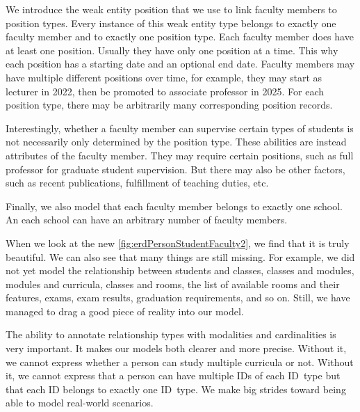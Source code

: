 We introduce the weak entity position that we use to link faculty members to position types.
Every instance of this weak entity type belongs to exactly one faculty member and to exactly one position type.
Each faculty member does have at least one position.
Usually they have only one position at a time.
This why each position has a starting date and an optional end date.
Faculty members may have multiple different positions over time, for example, they may start as lecturer in 2022, then be promoted to associate professor in 2025.
For each position type, there may be arbitrarily many corresponding position records.

Interestingly, whether a faculty member can supervise certain types of students is not necessarily only determined by the position type.
These abilities are instead attributes of the faculty member.
They may require certain positions, such as full professor for graduate student supervision.
But there may also be other factors, such as recent publications, fulfillment of teaching duties, etc.

Finally, we also model that each faculty member belongs to exactly one school.
An each school can have an arbitrary number of faculty members.

When we look at the new \cref{fig:erdPersonStudentFaculty2}, we find that it is truly beautiful.
We can also see that many things are still missing.
For example, we did not yet model the relationship between students and classes, classes and modules, modules and curricula, classes and rooms, the list of available rooms and their features, exams, exam results, graduation requirements, and so on.
Still, we have managed to drag a good piece of reality into our model.

The ability to annotate relationship types with modalities and cardinalities is very important.
It makes our models both clearer and more precise.
Without it, we cannot express whether a person can study multiple curricula or not.
Without it, we cannot express that a person can have multiple IDs of each ID~type but that each ID belongs to exactly one ID~type.
We make big strides toward being able to model real-world scenarios.%
%
\FloatBarrier%
\endhsection%
%
